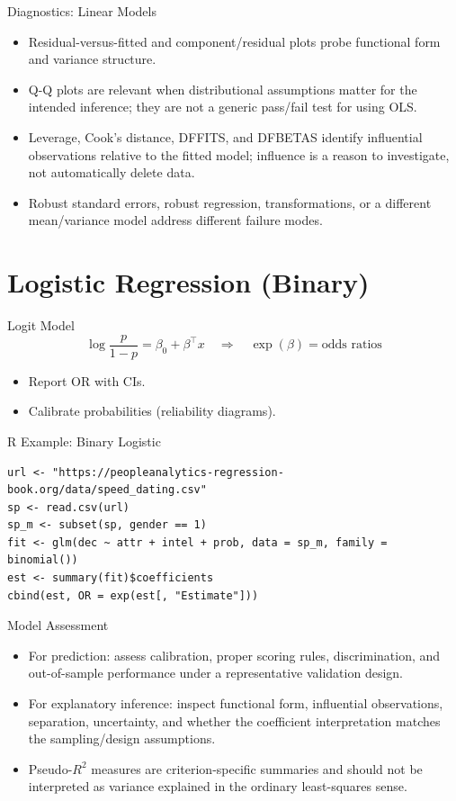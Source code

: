 \documentclass[aspectratio=169]{beamer}
\begin{document}
\begin{frame}{Diagnostics: Linear Models}
\begin{itemize}
  \item Residual-versus-fitted and component/residual plots probe functional form and variance structure.
  \item Q-Q plots are relevant when distributional assumptions matter for the intended inference; they are not a generic pass/fail test for using OLS.
  \item Leverage, Cook's distance, DFFITS, and DFBETAS identify influential observations relative to the fitted model; influence is a reason to investigate, not automatically delete data.
  \item Robust standard errors, robust regression, transformations, or a different mean/variance model address different failure modes.
\end{itemize}
\end{frame}

\section{Logistic Regression (Binary)}

\begin{frame}{Logit Model}
\[\log\frac{p}{1-p}=\beta_0+\beta^\top x \quad \Rightarrow \quad \exp(\beta)=\text{odds ratios}\]
\begin{itemize}
  \item Report OR with CIs.
  \item Calibrate probabilities (reliability diagrams).
\end{itemize}
\end{frame}

\begin{frame}[fragile]{R Example: Binary Logistic}
\begin{lstlisting}[style=rcode]
url <- "https://peopleanalytics-regression-book.org/data/speed_dating.csv"
sp <- read.csv(url)
sp_m <- subset(sp, gender == 1)
fit <- glm(dec ~ attr + intel + prob, data = sp_m, family = binomial())
est <- summary(fit)$coefficients
cbind(est, OR = exp(est[, "Estimate"]))
\end{lstlisting}
\end{frame}

\begin{frame}{Model Assessment}
\begin{itemize}
  \item For prediction: assess calibration, proper scoring rules, discrimination, and out-of-sample performance under a representative validation design.
  \item For explanatory inference: inspect functional form, influential observations, separation, uncertainty, and whether the coefficient interpretation matches the sampling/design assumptions.
  \item Pseudo-$R^2$ measures are criterion-specific summaries and should not be interpreted as variance explained in the ordinary least-squares sense.
\end{itemize}
\end{frame}
\end{document}
